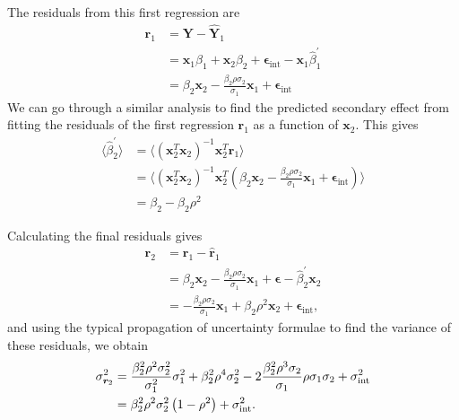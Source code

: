 The residuals from this first regression are
\begin{align*}
    \bm{r}_1 &= \bm{Y}-\bm{\hat{Y}}_1 \\
    &= \bm{x}_1\beta_1 + \bm{x}_2\beta_2 + \bm{\epsilon}_\text{int}-\bm{x}_1\hat{\beta}_1^\prime\\
    &= \beta_2\bm{x}_2 - \frac{\beta_2\rho\sigma_2}{\sigma_1}\bm{x}_1 + \bm{\epsilon}_\text{int}
\end{align*}
We can go through a similar analysis to find the predicted secondary effect from fitting the residuals of the first regression $\bm{r}_1$ as a function of $\bm{x}_2$. This gives
\begin{align*}
    \langle\hat{\beta}_2^\prime\rangle &= \langle(\bm{x}_2^T\bm{x}_2)^{-1}\bm{x}_2^T\bm{r}_1\rangle\\
    &= \langle(\bm{x}_2^T\bm{x}_2)^{-1}\bm{x}_2^T(\beta_2\bm{x}_2 - \frac{\beta_2\rho\sigma_2}{\sigma_1}\bm{x}_1 + \bm{\epsilon}_\text{int})\rangle\\
    &= \beta_2 - \beta_2\rho^2
\end{align*}

Calculating the final residuals gives
\begin{align*}
    \bm{r}_2 &= \bm{r}_1 - \bm{\hat{r}}_1\\
    &= \beta_2\bm{x}_2 - \frac{\beta_2\rho\sigma_2}{\sigma_1}\bm{x}_1 + \bm{\epsilon} - \hat{\beta}_2^\prime\bm{x}_2\\
    &= - \frac{\beta_2\rho\sigma_2}{\sigma_1}\bm{x}_1 + \beta_2\rho^2\bm{x}_2 + \bm{\epsilon}_\text{int},
\end{align*}
and using the typical propagation of uncertainty formulae to find the variance of these residuals, we obtain
\begin{align*}
    \sigma_{\bm{r}_2}^2 &= \frac{\beta_2^2\rho^2\sigma_2^2}{\sigma_1^2}\sigma_1^2 + \beta_2^2\rho^4\sigma_2^2 - 2\frac{\beta_2^2\rho^3\sigma_2}{\sigma_1}\rho\sigma_1\sigma_2 + \sigma_{\text{int}}^2\\
    &= \beta_2^2\rho^2\sigma_2^2\left(1-\rho^2\right) + \sigma_{\text{int}}^2.
\end{align*}

